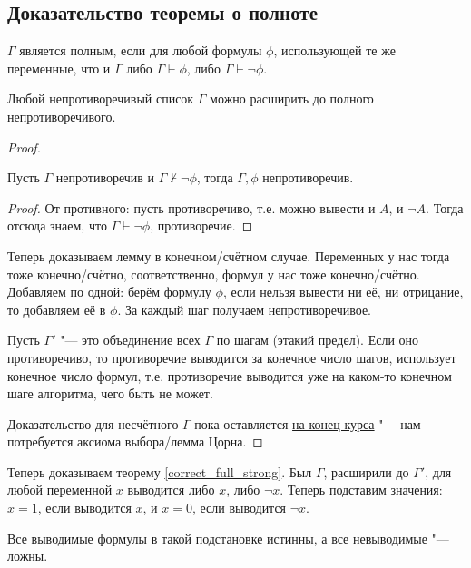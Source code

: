 \subsection{Доказательство теоремы о полноте}
\begin{Def}
	$\Gamma$ является полным, если для любой формулы $\phi$, использующей те же переменные, что и $\Gamma$
	либо $\Gamma \vdash \phi$, либо $\Gamma \vdash \lnot \phi$.
\end{Def}
\begin{lemma}
	Любой непротиворечивый список $\Gamma$ можно расширить до полного непротиворечивого.
\end{lemma}
\begin{proof}
	\begin{assertion}
		Пусть $\Gamma$ непротиворечив и $\Gamma \not \vdash \lnot \phi$, тогда
		$\Gamma, \phi$ непротиворечив.
	\end{assertion}
	\begin{proof}
		От противного: пусть противоречиво, т.е. можно вывести и $A$, и $\lnot A$.
		Тогда отсюда знаем, что $\Gamma \vdash \lnot \phi$, противоречие.
	\end{proof}
	Теперь доказываем лемму в конечном/счётном случае.
	Переменных у нас тогда тоже конечно/счётно, соответственно, формул у нас тоже конечно/счётно.
	Добавляем по одной: берём формулу $\phi$, если нельзя вывести ни её, ни отрицание, то добавляем её в $\phi$.
	За каждый шаг получаем непротиворечивое.

	Пусть $\Gamma'$ "--- это объединение всех $\Gamma$ по шагам (этакий предел).
	Если оно противоречиво, то противоречие выводится за конечное число шагов, использует конечное число формул,
	т.е. противоречие выводится уже на каком-то конечном шаге алгоритма, чего быть не может.

	Доказательство для несчётного $\Gamma$ пока оставляется \hyperref[zorn_lemma_exmp_list_full]{на конец курса} "--- нам потребуется аксиома выбора/лемма Цорна.
\end{proof}
Теперь доказываем теорему \ref{correct_full_strong}.
Был $\Gamma$, расширили до $\Gamma'$, для любой переменной $x$ выводится либо $x$, либо $\lnot x$.
Теперь подставим значения: $x=1$, если выводится $x$, и $x=0$, если выводится $\lnot x$.
\begin{assertion}
	Все выводимые формулы в такой подстановке истинны, а все невыводимые "--- ложны.
\end{assertion}
